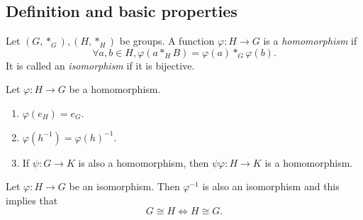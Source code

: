 \documentclass[10pt]{article}
\begin{document}
    \subsection{Definition and basic properties}
    \begin{definition}
        Let $ (G,*_G), (H,*_H) $ be groups. A function $ \varphi: H \to G $ is a \textit{homomorphism} if
        \[
            \forall a,b\in H, \varphi (a*_HB)=\varphi (a)*_G \varphi (b)
        .\]
        It is called an \textit{isomorphism} if it is bijective.
    \end{definition}
    \begin{proposition}\label{prop:homom}
        Let $ \varphi :H\to G $ be a homomorphism.
        \begin{enumerate}[(1)]
            \item $ \varphi (e_H)=e_G $.
            \item $ \varphi (h^{-1})=\varphi (h)^{-1} $.
            \item If $ \psi:G\to K $ is also a homomorphism, then $ \psi \varphi :H\to K $ is a homomorphism.
        \end{enumerate}
    \end{proposition}
    \begin{proposition}\label{prop:isom_inverse_is_also_an_isom}
        Let $ \varphi :H\to G $ be an isomorphism. Then $ \varphi^{-1} $ is also an isomorphism and this implies that 
        \[
            G \cong H \Longleftrightarrow H \cong G
        .\]
    \end{proposition}
\end{document}

